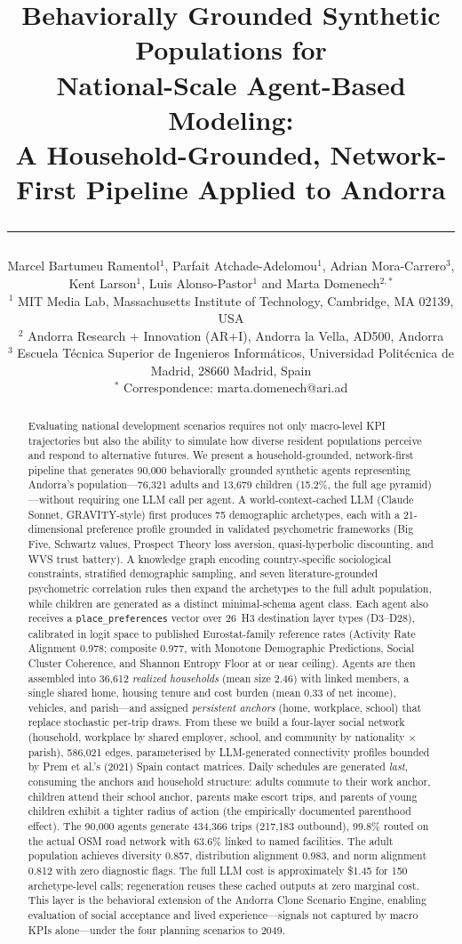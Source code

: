 \documentclass[a4paper,12pt]{article}
\title{\textbf{Behaviorally Grounded Synthetic Populations for\\
National-Scale Agent-Based Modeling:\\
A Household-Grounded, Network-First Pipeline Applied to Andorra}\\[0.1em]
{\normalfont\rule{0.6\textwidth}{0.4pt}}}
\author{Marcel Bartumeu Ramentol$^{1}$,
        Parfait Atchade-Adelomou$^{1}$,
        Adrian Mora-Carrero$^{3}$,\\
        Kent Larson$^{1}$,
        Luis Alonso-Pastor$^{1}$ and
        Marta Domenech$^{2,*}$\\[0.8em]
{\normalsize
$^{1}$ MIT Media Lab, Massachusetts Institute of Technology, Cambridge, MA 02139, USA\\
$^{2}$ Andorra Research + Innovation (AR+I), Andorra la Vella, AD500, Andorra\\
$^{3}$ Escuela T\'ecnica Superior de Ingenieros Inform\'aticos,
       Universidad Polit\'ecnica de Madrid, 28660 Madrid, Spain\\[0.4em]
$^{*}$ Correspondence: marta.domenech@ari.ad
}}
\date{}
\begin{document}
\maketitle

\begin{abstract}
Evaluating national development scenarios requires not only macro-level KPI
trajectories but also the ability to simulate how diverse resident populations
perceive and respond to alternative futures. We present a household-grounded,
network-first pipeline that generates 90,000 behaviorally grounded synthetic
agents representing Andorra's population---76{,}321 adults and 13{,}679 children
(15.2\%, the full age pyramid)---without requiring one LLM call per agent. A
world-context-cached LLM (Claude Sonnet, GRAVITY-style) first produces 75
demographic archetypes, each with a 21-dimensional preference profile grounded in
validated psychometric frameworks (Big Five, Schwartz values, Prospect Theory loss
aversion, quasi-hyperbolic discounting, and WVS trust battery). A knowledge graph
encoding country-specific sociological constraints, stratified demographic sampling,
and seven literature-grounded psychometric correlation rules then expand the
archetypes to the full adult population, while children are generated as a distinct
minimal-schema agent class. Each agent also receives a \texttt{place\_preferences}
vector over 26~H3 destination layer types (D3--D28), calibrated in logit space to
published Eurostat-family reference rates (Activity Rate Alignment 0.978; composite
0.977, with Monotone Demographic Predictions, Social Cluster Coherence, and Shannon
Entropy Floor at or near ceiling). Agents are then assembled into 36{,}612
\emph{realized households} (mean size 2.46) with linked members, a single shared
home, housing tenure and cost burden (mean 0.33 of net income), vehicles, and
parish---and assigned \emph{persistent anchors} (home, workplace, school) that
replace stochastic per-trip draws. From these we build a four-layer social network
(household, workplace by shared employer, school, and community by nationality
$\times$ parish), 586{,}021 edges, parameterised by LLM-generated connectivity
profiles bounded by Prem et al.'s (2021) Spain contact matrices. Daily schedules
are generated \emph{last}, consuming the anchors and household structure: adults
commute to their work anchor, children attend their school anchor, parents make
escort trips, and parents of young children exhibit a tighter radius of action
(the empirically documented parenthood effect). The 90,000 agents generate
434{,}366 trips (217{,}183 outbound), 99.8\% routed on the actual OSM road network
with 63.6\% linked to named facilities. The adult population achieves diversity
0.857, distribution alignment 0.983, and norm alignment 0.812 with zero diagnostic
flags. The full LLM cost is approximately \$1.45 for 150 archetype-level calls;
regeneration reuses these cached outputs at zero marginal cost. This layer is the
behavioral extension of the Andorra Clone Scenario Engine, enabling evaluation of
social acceptance and lived experience---signals not captured by macro KPIs
alone---under the four planning scenarios to 2049.
\end{abstract}
\end{document}
